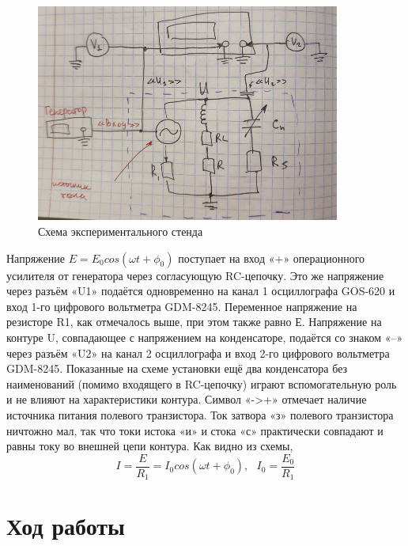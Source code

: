 \documentclass[a4paper]{article}
\begin{document}
\begin{figure}[h]
    \centering
    \includegraphics[width=10cm]{exper_setup.png}
    \caption{Схема экспериментального стенда}
    \label{fig:vac}
\end{figure}

Напряжение $ E = E_0cos(\omega t + \phi_0) $ поступает на вход «+» операционного усилителя от генератора через согласующую RC-цепочку. Это же напряжение через разъём «U1» подаётся одновременно на канал 1 осциллографа GOS-620 и вход 1-го цифрового вольтметра GDM-8245. Переменное напряжение на резисторе R1, как отмечалось выше, при этом также равно Е. Напряжение на контуре U, совпадающее с напряжением на конденсаторе, подаётся со знаком «–» через разъём «U2» на канал 2 осциллографа и вход 2-го цифрового вольтметра GDM-8245. Показанные на схеме установки ещё два конденсатора без наименований (помимо входящего в RC-цепочку) играют вспомогательную роль и не влияют на характеристики контура. Символ «->+» отмечает наличие источника питания полевого транзистора. Ток затвора «з» полевого транзистора ничтожно мал, так что токи истока «и» и стока «с» практически совпадают и равны току во внешней цепи контура. Как видно из схемы, \[ I = \frac{E}{R_1} = I_0cos(\omega t + \phi_0), \:\:\: I_0 = \frac{E_0}{R_1} \]


\section{Ход работы}
\end{document}
